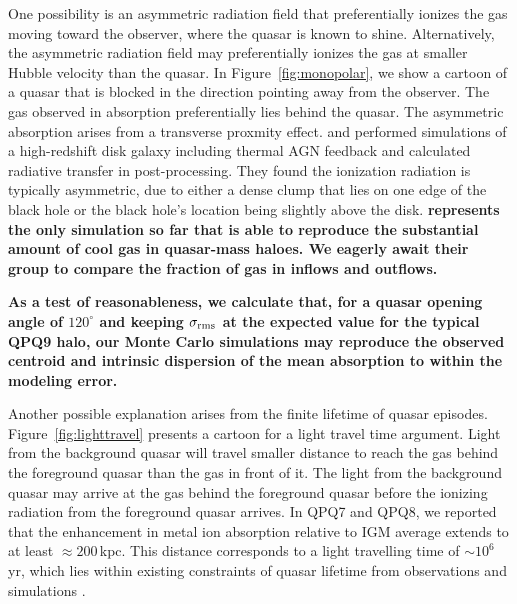 \documentclass[iop]{emulateapj}
\begin{document}
{One possibility is an asymmetric radiation field that preferentially ionizes the gas moving toward 
the observer, where the quasar is known to shine. Alternatively, the asymmetric radiation field 
may preferentially ionizes the gas at smaller Hubble velocity than the quasar. In 
Figure~\ref{fig:monopolar}, we show a cartoon of a quasar that is blocked in the direction 
pointing away from the observer. The gas observed in absorption preferentially lies behind the 
quasar. The asymmetric absorption arises from a transverse proxmity effect. 
\cite{Roos+15} and \cite{GaborBournaud14} performed simulations of a high-redshift disk galaxy 
including thermal AGN feedback and calculated radiative transfer in post-processing. They found 
the ionization radiation is typically asymmetric, due to either a dense clump that lies on one 
edge of the black hole or the black hole's location being slightly above the disk.
{\bf \cite{FaucherGiguere+16} represents the only simulation so far that is able to reproduce the
substantial amount of cool gas in quasar-mass haloes. We eagerly await their group to compare the
fraction of gas in inflows and outflows.}

{\bf As a test of reasonableness, we calculate that, for a quasar opening angle of $120^\circ$ and
keeping $\sigma_{\rm rms}$ at the expected value for the typical QPQ9 halo, our Monte Carlo
simulations may reproduce the observed centroid and intrinsic dispersion of the  mean
absorption to within the modeling error.}

Another possible explanation arises from the finite lifetime of quasar episodes. 
Figure~\ref{fig:lighttravel} presents a cartoon for a light travel time argument. Light from the 
background quasar will travel smaller distance to reach the gas behind the foreground quasar 
than the gas in front of it. The light from the background quasar may arrive at the gas behind 
the foreground quasar before the ionizing radiation from the foreground quasar arrives. In 
QPQ7 and QPQ8, we reported that the enhancement in metal ion absorption relative to IGM average 
extends to at least $\approx200$\,kpc. This distance corresponds to a light travelling time of 
$\sim10^6$\,yr, which lies within existing constraints of quasar lifetime from observations 
\citep[e.g.][]{Martini04} and simulations \citep[e.g.][]{Hopkins+05}. 

}
\end{document}
